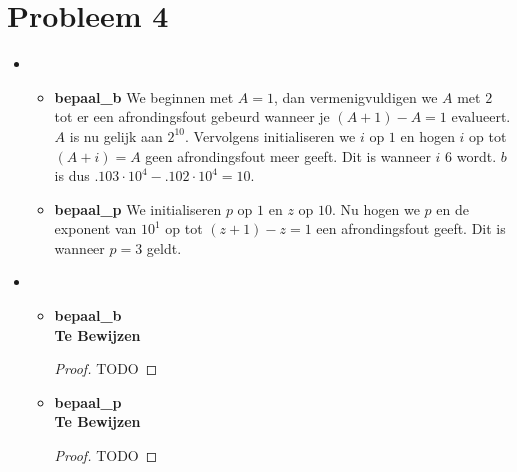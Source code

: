 \documentclass[12pt,a4paper]{article}
\begin{document}
\section{Probleem 4}
\begin{itemize}
\item
\begin{itemize}
\item \textbf{bepaal\_b}
We beginnen met $A=1$, dan vermenigvuldigen we $A$ met $2$ tot er een afrondingsfout gebeurd wanneer je $(A+1)-A=1$ evalueert. 
$A$ is nu gelijk aan $2^{10}$. Vervolgens initialiseren we $i$ op $1$ en hogen $i$ op tot $(A+i)=A$ geen afrondingsfout meer geeft. Dit is wanneer $i$ $6$ wordt. $b$ is dus $.103\cdot 10^4-.102\cdot 10^4=10$.
\item \textbf{bepaal\_p}
We initialiseren $p$ op $1$ en $z$ op $10$. Nu hogen we $p$ en de exponent van $10^1$ op tot $(z+1)-z=1$ een afrondingsfout geeft.
Dit is wanneer $p=3$ geldt. 
\end{itemize}
\item
\begin{itemize}
\item \textbf{bepaal\_b}\\
\textbf{Te Bewijzen}
\begin{proof}
TODO
\end{proof}
\item \textbf{bepaal\_p}\\
\textbf{Te Bewijzen}
\begin{proof}
TODO
\end{proof}
\end{itemize}
\end{itemize}
\end{document}
